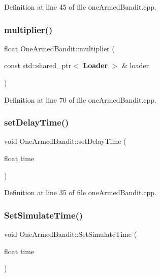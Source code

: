 Definition at line 45 of file one\+Armed\+Bandit.\+cpp.

\mbox{\label{class_one_armed_bandit_a3bd59ee339183ab585e1ce8e2fdfdb0d}} 
\subsubsection{multiplier()}
{\footnotesize\ttfamily float One\+Armed\+Bandit\+::multiplier (\begin{DoxyParamCaption}\item[{const std\+::shared\+\_\+ptr$<$ \textbf{ Loader} $>$ \&}]{loader }\end{DoxyParamCaption})}



Definition at line 70 of file one\+Armed\+Bandit.\+cpp.

\mbox{\label{class_one_armed_bandit_a227d7a5acdf875014950ab0cdcd058c6}} 
\subsubsection{set\+Delay\+Time()}
{\footnotesize\ttfamily void One\+Armed\+Bandit\+::set\+Delay\+Time (\begin{DoxyParamCaption}\item[{float}]{time }\end{DoxyParamCaption})}



Definition at line 35 of file one\+Armed\+Bandit.\+cpp.

\mbox{\label{class_one_armed_bandit_a85dc36a710ccabfffd5cc56d6255c350}} 
\subsubsection{Set\+Simulate\+Time()}
{\footnotesize\ttfamily void One\+Armed\+Bandit\+::\+Set\+Simulate\+Time (\begin{DoxyParamCaption}\item[{float}]{time }\end{DoxyParamCaption})}



